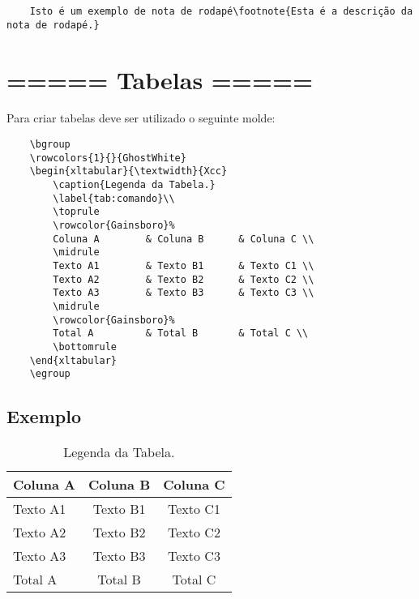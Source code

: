 \begin{verbatim}
    Isto é um exemplo de nota de rodapé\footnote{Esta é a descrição da nota de rodapé.}
\end{verbatim}


\section{===== Tabelas =====}

Para criar tabelas deve ser utilizado o seguinte molde:

\begin{verbatim}
    \bgroup
    \rowcolors{1}{}{GhostWhite}
    \begin{xltabular}{\textwidth}{Xcc}
        \caption{Legenda da Tabela.}
        \label{tab:comando}\\
        \toprule
        \rowcolor{Gainsboro}%
        Coluna A        & Coluna B      & Coluna C \\
        \midrule
        Texto A1        & Texto B1      & Texto C1 \\
        Texto A2        & Texto B2      & Texto C2 \\
        Texto A3        & Texto B3      & Texto C3 \\
        \midrule
        \rowcolor{Gainsboro}%
        Total A         & Total B       & Total C \\
        \bottomrule
    \end{xltabular}
    \egroup
\end{verbatim}

\subsection{Exemplo}

\bgroup
{}
\begin{xltabular}{\textwidth}{Xcc}
    \caption{Legenda da Tabela.}
    \label{tab:comando}\\
    \toprule
    Coluna A        & Coluna B      & Coluna C \\
    \midrule
    Texto A1        & Texto B1      & Texto C1 \\
    Texto A2        & Texto B2      & Texto C2 \\
    Texto A3        & Texto B3      & Texto C3 \\
    \midrule
    Total A         & Total B       & Total C \\
    \bottomrule
\end{xltabular}
\egroup


